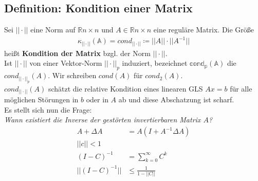 \documentclass[ngerman,fontsize=11pt, paper=a4, parskip=false, titlepage=false, toc=bib]{scrbook}
\newcommand{\R}{\mathbb{R}}
\begin{document}
\subsection{Definition: Kondition einer Matrix} 
Sei $||\cdot||$ eine Norm auf $\R{n\times n} $ und $A\in \R{n\times n}$ eine reguläre Matrix.
Die Größe
\begin{gather*}
	\mathbb{\kappa_{||\cdot||}(A) }= cond_{||\cdot||} \coloneqq ||A|| \cdot ||A^{-1}||
\end{gather*}
heißt \textbf{Kondition der Matrix} bzgl. der Norm ${||\cdot||}$. \\
Ist  ${||\cdot||}$ von einer Vektor-Norm ${||\cdot||}_p$ induziert, bezeichnet 
	$\mathbb{cond_p(A)}$
die $cond_{||\cdot||_p}(A)$. Wir schreiben $cond(A)$ für $cond_2(A)$. \\
$cond_{||\cdot||}(A) $ schätzt die relative Kondition eines linearen GLS $Ax=b$ für alle möglichen Störungen in $b$ oder in $A$ ab und diese Abschatzung ist scharf. \\
Es stellt sich nun die Frage: \\
\textit{Wann existiert die Inverse der gestörten invertierbaren Matrix $A$?}
\begin{align*}
	A+\Delta A &= A (I+A^{-1}\Delta A)\\
	||c|| < 1 \\
	(I-C)^{-1} &= \sum_{k=0}^{\infty}C^k \\
	||	(I-C)^{-1} || &\leq \frac{1}{1-||C||}
\end{align*}


%



\printindex		%
\end{document}
